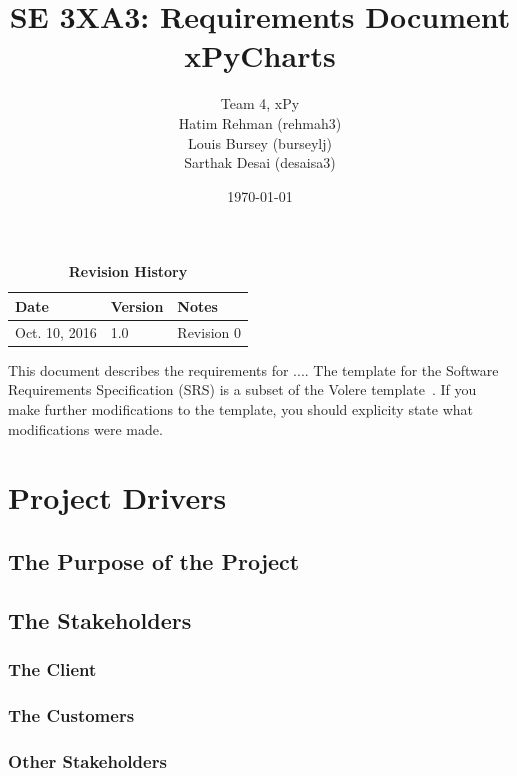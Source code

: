 \documentclass[12pt, titlepage]{article}
\title{SE 3XA3: Requirements Document\\xPyCharts}
\author{Team 4, xPy
		\\ Hatim Rehman (rehmah3)
		\\ Louis Bursey (burseylj)
		\\ Sarthak Desai (desaisa3)
}
\date{\today}
\begin{document}
\maketitle

\tableofcontents
\listoftables
\listoffigures

\begin{table}[bp]
\caption{\bf Revision History}
\begin{tabularx}{\textwidth}{p{3cm}p{2cm}X}
\toprule {\bf Date} & {\bf Version} & {\bf Notes}\\
\midrule
Oct. 10, 2016 & 1.0 & Revision 0\\
\bottomrule
\end{tabularx}
\end{table}

\newpage


This document describes the requirements for ....  The template for the Software
Requirements Specification (SRS) is a subset of the Volere
template~\citep{RobertsonAndRobertson2012}.  If you make further modifications
to the template, you should explicity state what modifications were made.

\section{Project Drivers}

\subsection{The Purpose of the Project}

\subsection{The Stakeholders}

\subsubsection{The Client}

\subsubsection{The Customers}

\subsubsection{Other Stakeholders}
\end{document}
